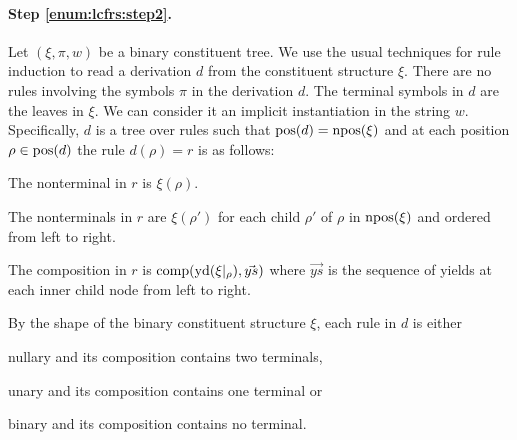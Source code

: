 \documentclass[../../document.tex]{subfiles}
\begin{document}
    \paragraph{Step \ref{enum:lcfrs:step2}.}
    Let \((\xi, \pi, w)\) be a binary constituent tree.
    We use the usual techniques for  rule induction to read a derivation \(d\) from the constituent structure \(\xi\).
    There are no rules involving the  symbols \(\pi\) in the derivation \(d\).
    The terminal symbols in \(d\) are the leaves in \(\xi\). We can consider it an implicit instantiation in the string \(w\).
    Specifically, \(d\) is a tree over  rules such that \(\operatorname{pos}(d) = \operatorname{npos}(\xi)\) and at each position \(\rho \in \operatorname{pos}(d)\) the rule \(d(\rho) = r\) is as follows:
    \begin{compactitem}
        \item The  nonterminal in \(r\) is \(\xi(\rho)\).
        \item The  nonterminals in \(r\) are \(\xi(\rho')\) for each child \(\rho'\) of \(\rho\) in \(\operatorname{npos}(\xi)\) and ordered from left to right.
        \item The composition in \(r\) is \(\mathrm{comp}(\operatorname{yd}(\xi|_\rho), \vec{ys})\) where \(\vec{ys}\) is the sequence of yields at each inner child node from left to right.
    \end{compactitem}
    By the shape of the binary constituent structure \(\xi\), each rule in \(d\) is either
    \begin{inparaitem}[]
        \item nullary and its composition contains two terminals,
        \item unary and its composition contains one terminal or
        \item binary and its composition contains no terminal.
    \end{inparaitem}
\end{document}
